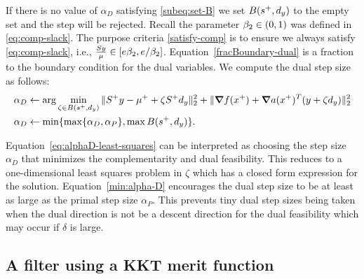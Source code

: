 \documentclass{article}
\begin{document}
If there is no value of $\alpha_{D}$ satisfying \eqref{subeq:set-B} we set $B( s^{+}, d_{y} )$ to the empty set and the step will be rejected. Recall the parameter $\beta_{2} \in (0,1)$ was defined in \eqref{eq:comp-slack}. The purpose criteria \eqref{satisfy-comp} is to ensure we always satisfy \eqref{eq:comp-slack}, i.e., $\frac{S y}{\mu} \in [e \beta_{2}, e/\beta_{2} ]$. Equation~\eqref{fracBoundary-dual} is a fraction to the boundary condition for the dual variables.
 We compute the dual step size as follows:
\begin{subequations}\label{eq:compute-alpha-D}
\begin{flalign}
\alpha_{D} &\gets \arg \min_{\zeta \in B( s^{+}, \dir{y} )} \| S^{+} y - \mu^{+} + \zeta S^{+} \dir{y} \|^2_{2} + \| \grad \obj(x^{+})   +  \grad \cons(x^{+})^T (y + \zeta \dir{y}) \|^{2}_{2} %
\label{eq:alphaD-least-squares} \\
 \alpha_{D} &\gets \min\{ \max\{ \alpha_{D}, \alpha_{P} \}, \max B( s^{+}, \dir{y} ) \}. \label{min:alpha-D}
\end{flalign}
\end{subequations}

Equation~\eqref{eq:alphaD-least-squares} can be interpreted as choosing the step size $\alpha_{D}$ that minimizes the complementarity and dual feasibility. This reduces to a one-dimensional least squares problem in $\zeta$ which has a closed form expression for the solution. Equation~\eqref{min:alpha-D} encourages the dual step size to be at least as large as the primal step size $\alpha_{P}$. This prevents tiny dual step sizes being taken when the dual direction is not be a descent direction for the dual feasibility which may occur if $\delta$ is large. %


\subsection{A filter using a KKT merit function}\label{sec:filter}
\end{document}

